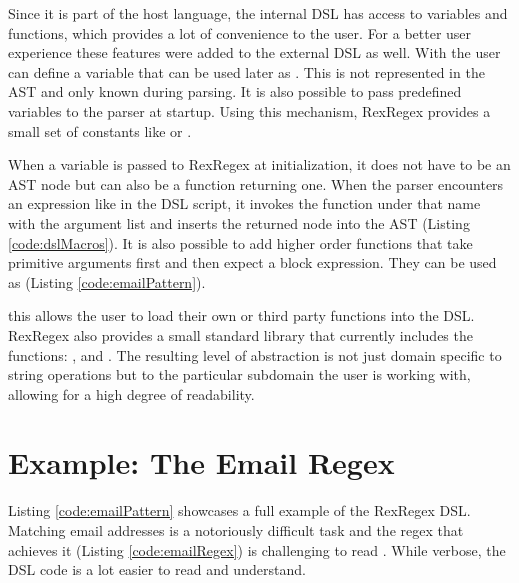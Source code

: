 Since it is part of the host language, the internal DSL has access to variables and functions, which provides a lot of convenience to the user. For a better user experience these features were added to the external DSL as well. With  the user can define a variable that can be used later as . This is not represented in the AST and only known during parsing. It is also possible to pass predefined variables  to the parser at startup. Using this mechanism, RexRegex provides a small set of constants like  or . 

When a variable is passed to RexRegex at initialization, it does not have to be an AST node but can also be a function returning one. When the parser encounters an expression like  in the DSL script, it invokes the function under that name with the argument list and inserts the returned node into the AST (Listing \ref{code:dslMacros}). It is also possible to add higher order functions  that take primitive arguments first and then expect a block expression. They can be used as  (Listing \ref{code:emailPattern}).

this allows the user to load their own or third party functions into the DSL. RexRegex also provides a small standard library that currently includes the functions: ,  and . The resulting level of abstraction is not just domain specific to string operations but to the particular subdomain the user is working with, allowing for a high degree of readability.

\section{Example: The Email Regex}

Listing \ref{code:emailPattern} showcases a full example of the RexRegex DSL. Matching email addresses is a notoriously difficult task and the regex that achieves it (Listing \ref{code:emailRegex}) is challenging to read \cite{EmailRegex}. While verbose, the DSL code is a lot easier to read and understand.

